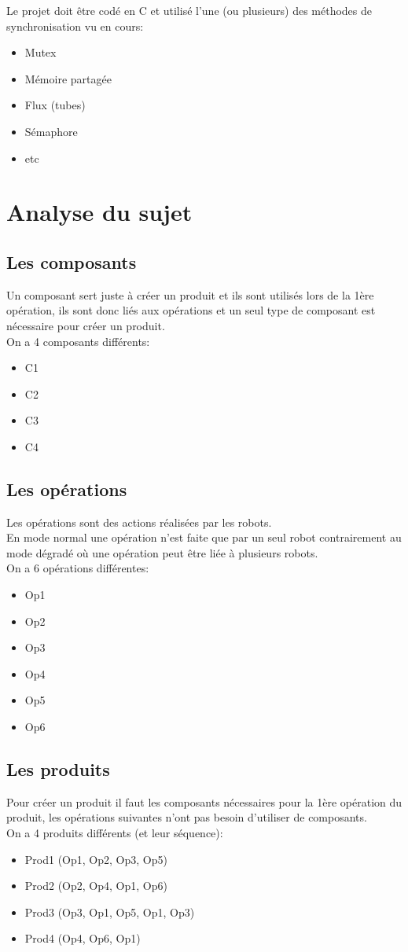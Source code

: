 \documentclass{report}
\begin{document}
Le projet doit être codé en C et utilisé l'une (ou plusieurs) des méthodes de synchronisation vu en cours:
\begin{itemize}
\item Mutex
\item Mémoire partagée
\item Flux (tubes)
\item Sémaphore
\item etc
\end{itemize}
\section{Analyse du sujet}
\subsection{Les composants}
Un composant sert juste à créer un produit et ils sont utilisés lors de la 1ère opération, ils sont donc liés aux opérations et un seul type de composant est nécessaire pour créer un produit.\\
On a 4 composants différents:
\begin{itemize}
\item C1
\item C2
\item C3
\item C4
\end{itemize}
\subsection{Les opérations}
Les opérations sont des actions réalisées par les robots.\\
En mode normal une opération n'est faite que par un seul robot contrairement au mode dégradé où une opération peut être liée à plusieurs robots.\\
On a 6 opérations différentes:
\begin{itemize}
\item Op1
\item Op2
\item Op3
\item Op4
\item Op5
\item Op6
\end{itemize}
\subsection{Les produits}
Pour créer un produit il faut les composants nécessaires pour la 1ère opération du produit, les opérations suivantes n'ont pas besoin d'utiliser de composants.\\
On a 4 produits différents (et leur séquence):
\begin{itemize}
\item Prod1 (Op1, Op2, Op3, Op5)
\item Prod2 (Op2, Op4, Op1, Op6)
\item Prod3 (Op3, Op1, Op5, Op1, Op3)
\item Prod4 (Op4, Op6, Op1)
\end{itemize}
\end{document}
